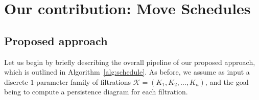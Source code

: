 \documentclass{siamart190516}
\begin{document}

\section{Our contribution: Move Schedules}\label{sec:move_schedules}
%

\subsection{Proposed approach}
Let us begin by briefly describing the overall pipeline of our proposed approach, which is outlined in Algorithm~\ref{alg:schedule}. As before, we assume as input  a discrete $1$-parameter family of filtrations $\mathcal{K} = (K_1, K_2, \dots, K_n)$, 
and the goal being to compute a persistence diagram for each filtration. 
\end{document}
